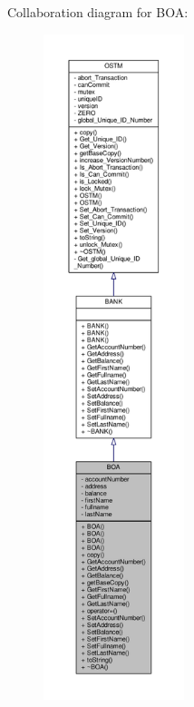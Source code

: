 Collaboration diagram for B\+OA\+:\nopagebreak
\begin{figure}[H]
\begin{center}
\leavevmode
\includegraphics[height=550pt]{class_b_o_a__coll__graph}
\end{center}
\end{figure}
